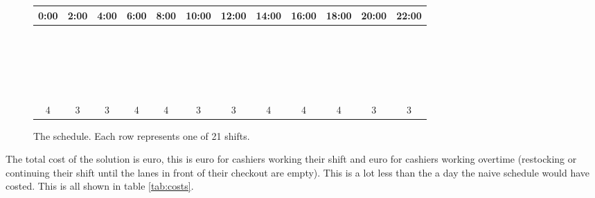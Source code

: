 \newcommand{\cc}{\cellcolor{cyan}}

\begin{figure}
	\centering

	\renewcommand{\arraystretch}{0.6} %
	
\begin{tabular}{|c|c|c|c|c|c|c|c|c|c|c|c|}
	\hline
	0:00 & 2:00 & 4:00 & 6:00 & 8:00 & 10:00 & 12:00 & 14:00 & 16:00 & 18:00 & 20:00 & 22:00  \\
	\hline
	\hline
	\cc & \cc & & & & & & & & & & \\ \hline 
	& \cc & \cc & & & & & & & & & \\ \hline
	& \cc & \cc & & & & & & & & & \\ \hline
	& & \cc & \cc & & & & & & & & \\ \hline
	& & & \cc & \cc & & & & & & & \\ \hline
	& & & \cc & \cc & & & & & & & \\ \hline
	& & & \cc & \cc & & & & & & & \\ \hline
	& & & & \cc & \cc & & & & & & \\ \hline
	& & & & & \cc & \cc & & & & & \\ \hline
	& & & & & \cc & \cc & & & & & \\ \hline
	& & & & & & \cc & \cc & & & & \\ \hline
	& & & & & & & \cc & \cc & & & \\ \hline
	& & & & & & & \cc & \cc & & & \\ \hline
	& & & & & & & \cc & \cc & & & \\ \hline
	& & & & & & & & \cc & \cc & & \\ \hline
	& & & & & & & & & \cc & \cc & \\ \hline
	& & & & & & & & & \cc & \cc & \\ \hline
	& & & & & & & & & \cc & \cc & \\ \hline
	\cc & & & & & & & & & & & \cc \\ \hline
	\cc & & & & & & & & & & & \cc \\ \hline
	\cc & & & & & & & & & & & \cc \\ 
	\hline
	\hline
	4 & 3 & 3 & 4 & 4 & 3 & 3 & 4 & 4 & 4 & 3 & 3\\
	\hline
\end{tabular}
\caption{The schedule. Each row represents one of 21 shifts.}
\label{fig:schedule}
\end{figure}

The total cost of the solution is  euro, this is  euro for cashiers working their shift and  euro for cashiers working overtime (restocking or continuing their shift until the lanes in front of their checkout are empty). 
This is a lot less than the  a day the naive schedule would have costed.
This is all shown in table \autoref{tab:costs}.

